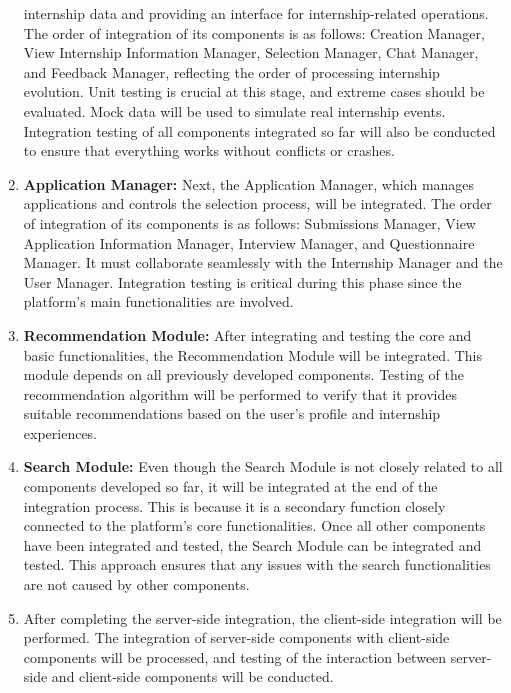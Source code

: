 \begin{enumerate}
    internship data and providing an interface for internship-related operations. The order of integration of its components is as follows: 
    Creation Manager, View Internship Information Manager, Selection Manager, Chat Manager, and Feedback Manager, reflecting the order of processing 
    internship evolution. Unit testing is crucial at this stage, and extreme cases should be evaluated. Mock data will be used to simulate real 
    internship events. Integration testing of all components integrated so far will also be conducted to ensure that everything works without 
    conflicts or crashes.
    \item \textbf{Application Manager:} Next, the Application Manager, which manages applications and controls the selection process, will be integrated. 
    The order of integration of its components is as follows: Submissions Manager, View Application Information Manager, Interview Manager, and 
    Questionnaire Manager. It must collaborate seamlessly with the Internship Manager and the User Manager. Integration testing is critical during 
    this phase since the platform's main functionalities are involved.
    \item \textbf{Recommendation Module:} After integrating and testing the core and basic functionalities, the Recommendation Module will be integrated. 
    This module depends on all previously developed components. Testing of the recommendation algorithm will be performed to verify that it provides 
    suitable recommendations based on the user's profile and internship experiences. 
    \item \textbf{Search Module:} Even though the Search Module is not closely related to all components developed so far, it will be integrated at the
     end of the integration process. This is because it is a secondary function closely connected to the platform's core functionalities. Once all other
      components have been integrated and tested, the Search Module can be integrated and tested. This approach ensures that any issues with the search 
      functionalities are not caused by other components.
    \item After completing the server-side integration, the client-side integration will be performed. The integration of server-side components with 
    client-side components will be processed, and testing of the interaction between server-side and client-side components will be conducted.
\end{enumerate}

